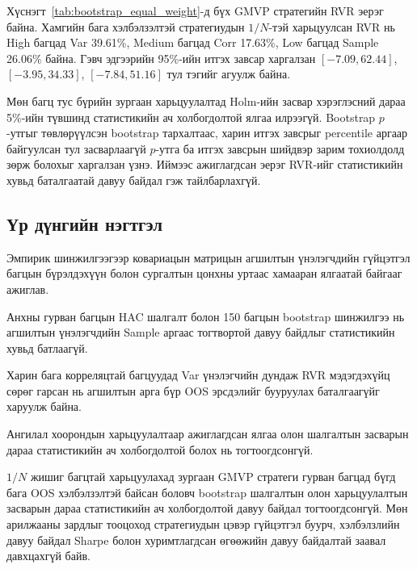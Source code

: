 Хүснэгт~\ref{tab:bootstrap_equal_weight}-д
бүх GMVP стратегийн RVR эерэг байна.
Хамгийн бага хэлбэлзэлтэй стратегиудын
$1/N$-тэй харьцуулсан RVR нь High
багцад Var 39.61\%, Medium багцад
Corr 17.63\%, Low багцад Sample
26.06\% байна. Гэвч эдгээрийн
95\%-ийн итгэх завсар харгалзан
$[-7.09,62.44]$, $[-3.95,34.33]$,
$[-7.84,51.16]$ тул тэгийг агуулж байна.

Мөн багц тус бүрийн зургаан
харьцуулалтад Holm-ийн засвар
хэрэглэсний дараа 5\%-ийн түвшинд
статистикийн ач холбогдолтой ялгаа
илрээгүй. Bootstrap $p$-утгыг
төвлөрүүлсэн bootstrap тархалтаас,
харин итгэх завсрыг percentile
аргаар байгуулсан тул засварлаагүй
$p$-утга ба итгэх завсрын шийдвэр
зарим тохиолдолд зөрж болохыг
харгалзан үзнэ. Иймээс ажиглагдсан
эерэг RVR-ийг статистикийн хувьд
баталгаатай давуу байдал гэж
тайлбарлахгүй.

\subsection{Үр дүнгийн нэгтгэл}
\label{subsec:results_summary}

Эмпирик шинжилгээгээр ковариацын
матрицын агшилтын үнэлэгчдийн
гүйцэтгэл багцын бүрэлдэхүүн болон
сургалтын цонхны уртаас хамааран
ялгаатай байгааг ажиглав.

Анхны гурван багцын HAC шалгалт
болон 150 багцын bootstrap шинжилгээ
нь агшилтын үнэлэгчдийн Sample
аргаас тогтвортой давуу байдлыг
статистикийн хувьд батлаагүй.

Харин бага корреляцтай багцуудад
Var үнэлэгчийн дундаж RVR
мэдэгдэхүйц сөрөг гарсан нь
агшилтын арга бүр OOS эрсдэлийг
бууруулах баталгаагүйг харуулж байна.

Ангилал хоорондын харьцуулалтаар
ажиглагдсан ялгаа олон шалгалтын
засварын дараа статистикийн
ач холбогдолтой болох нь
тогтоогдсонгүй.

$1/N$ жишиг багцтай харьцуулахад
зургаан GMVP стратеги гурван багцад
бүгд бага OOS хэлбэлзэлтэй байсан
боловч bootstrap шалгалтын
олон харьцуулалтын засварын дараа
статистикийн ач холбогдолтой давуу
байдал тогтоогдсонгүй. Мөн
арилжааны зардлыг тооцоход
стратегиудын цэвэр гүйцэтгэл
буурч, хэлбэлзлийн давуу байдал
Sharpe болон хуримтлагдсан
өгөөжийн давуу байдалтай
заавал давхцахгүй байв.